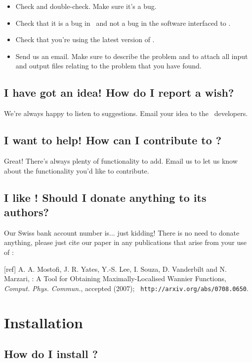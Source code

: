 \begin{itemize}
\item Check and double-check. Make sure it's a bug.
\item Check that it is a bug in \wannier\ and not a bug in the
  software interfaced to \wannier.
\item Check that you're using the latest version of \wannier.
\item Send us an email. Make sure to
  describe the problem and to attach all input and output files
  relating to the problem that you have found.
\end{itemize}

\subsection{I have got an idea! How do I report a wish?}

We're always happy to listen to suggestions. Email your idea to the
  \wannier\ developers.

\subsection{I want to help! How can I contribute to \wannier?}

Great! There's always plenty of functionality to add. Email us 
to let us know about the functionality you'd like to contribute. 

\subsection{I like \wannier! Should I donate anything to its authors?}

Our Swiss bank account number is... just kidding! There is no need to
donate anything, please just cite our paper in any publications that
arise from your use of \wannier:

[ref] A. A. Mostofi, J. R. Yates, Y.-S. Lee, I. Souza, D. Vanderbilt
and N. Marzari, \wannier: A Tool for Obtaining Maximally-Localised
Wannier Functions, {\it Comput. Phys. Commun.}, accepted (2007); {\tt
http://arxiv.org/abs/0708.0650}.

\section{Installation}

\subsection{How do I install \wannier?}

